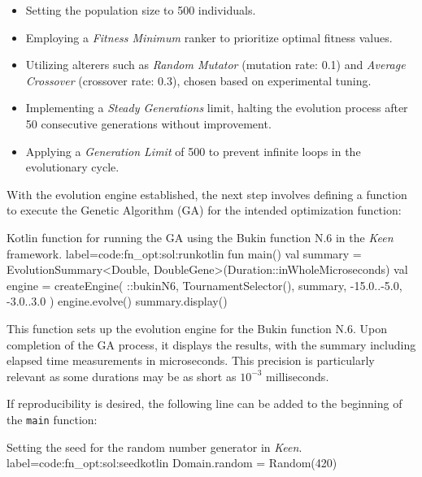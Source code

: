     \begin{itemize}
      \item Setting the population size to 500 individuals.
      \item Employing a \textit{Fitness Minimum} ranker to prioritize optimal 
        fitness values.
      \item Utilizing alterers such as \textit{Random Mutator} (mutation rate: 
        0.1) and \textit{Average Crossover} (crossover rate: 0.3), chosen based 
        on experimental tuning.
      \item Implementing a \textit{Steady Generations} limit, halting the 
        evolution process after 50 consecutive generations without improvement.
      \item Applying a \textit{Generation Limit} of 500 to prevent infinite 
        loops in the evolutionary cycle.
    \end{itemize}

    With the evolution engine established, the next step involves defining a 
    function to execute the Genetic Algorithm (GA) for the intended optimization 
    function:

    \begin{code}{
      Kotlin function for running the GA using the Bukin function N.6 in the \textit{Keen} framework.
    }{label=code:fn_opt:sol:run}{kotlin}
      fun main() {
          val summary = EvolutionSummary<Double, DoubleGene>(Duration::inWholeMicroseconds)
          val engine = createEngine(
              ::bukinN6, 
              TournamentSelector(), 
              summary, 
              -15.0..-5.0, 
              -3.0..3.0
          )
          engine.evolve()
          summary.display()
      }
    \end{code}

    This function sets up the evolution engine for the Bukin function N.6. Upon 
    completion of the GA process, it displays the results, with the summary 
    including elapsed time measurements in microseconds. This precision is 
    particularly relevant as some durations may be as short as \(10^{-3}\) 
    milliseconds.

    If reproducibility is desired, the following line can be added to the
    beginning of the \texttt{main} function:

    \begin{code}{
      Setting the seed for the random number generator in \textit{Keen}.
    }{label=code:fn_opt:sol:seed}{kotlin}
      Domain.random = Random(420)
    \end{code}
